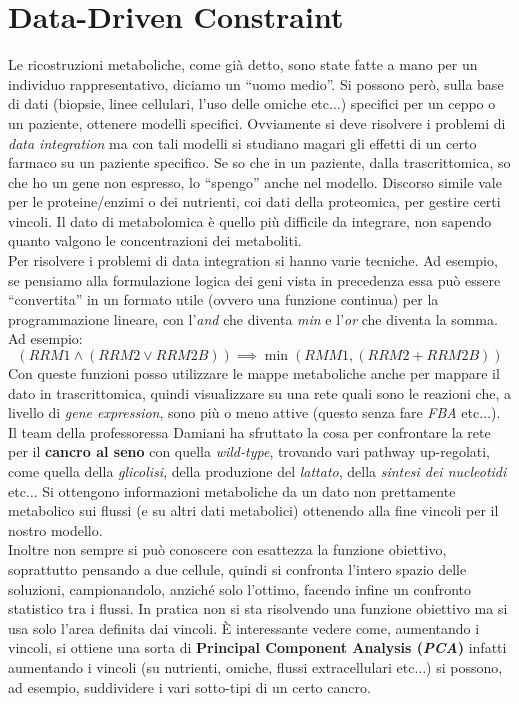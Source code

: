 \documentclass[a4paper,12pt, oneside]{book}
\begin{document}
\section{Data-Driven Constraint}
Le ricostruzioni metaboliche, come già detto, sono state fatte a mano per un
individuo rappresentativo, diciamo un ``uomo medio''. Si possono però, sulla
base di dati (biopsie, linee cellulari, l'uso delle omiche etc$\ldots$)
specifici per un ceppo o un paziente, ottenere modelli specifici. Ovviamente si
deve risolvere i problemi di \textit{data integration} ma con tali modelli si
studiano magari gli effetti di un certo farmaco su un paziente specifico. Se so
che in un paziente, dalla trascrittomica, so che ho un gene non espresso, lo
``spengo'' anche nel modello. Discorso simile vale per le proteine/enzimi o dei
nutrienti, coi dati della proteomica, per gestire certi vincoli. Il dato di
metabolomica è quello più difficile da integrare, non sapendo quanto valgono le
concentrazioni dei metaboliti.\\
Per risolvere i problemi di data integration si hanno varie tecniche. Ad
esempio, se pensiamo alla formulazione logica dei geni vista in precedenza essa
può essere ``convertita'' in un formato utile (ovvero una funzione continua) per
la programmazione lineare, con 
l'\textit{and} che diventa \textit{min} e l'\textit{or} che diventa la somma. Ad
esempio:
\[(RRM1\land(RRM2\lor RRM2B))\implies \min(RMM1, (RRM2+RRM2B))\]
Con queste funzioni posso utilizzare le mappe metaboliche anche per mappare il
dato in trascrittomica, quindi visualizzare su una rete quali sono le reazioni
che, a livello di \textit{gene expression}, sono più o meno attive (questo senza
fare \textit{FBA} etc$\ldots$). Il team della professoressa Damiani ha sfruttato
la cosa per confrontare la rete per il \textbf{cancro al seno} con quella
\textit{wild-type}, trovando vari pathway up-regolati, come quella della
\textit{glicolisi}, della produzione del \textit{lattato}, della
\textit{sintesi dei nucleotidi} etc$\ldots$ Si ottengono informazioni
metaboliche da un dato non prettamente metabolico sui flussi (e su altri dati
metabolici) ottenendo alla fine vincoli per il nostro modello.\\
Inoltre non sempre si può conoscere con esattezza la funzione obiettivo,
soprattutto pensando a due cellule, quindi si confronta l'intero spazio delle
soluzioni, campionandolo, anziché solo l'ottimo, facendo infine un confronto
statistico tra i flussi. In pratica non si sta risolvendo una funzione
obiettivo ma si usa solo l'area definita dai vincoli. È interessante vedere
come, aumentando i vincoli, si ottiene una sorta di
\textbf{Principal Component Analysis (\textit{PCA})} infatti aumentando i
vincoli (su nutrienti, omiche, flussi extracellulari etc$\ldots$) si possono, ad
esempio, suddividere i vari sotto-tipi di un certo cancro.
\end{document}

